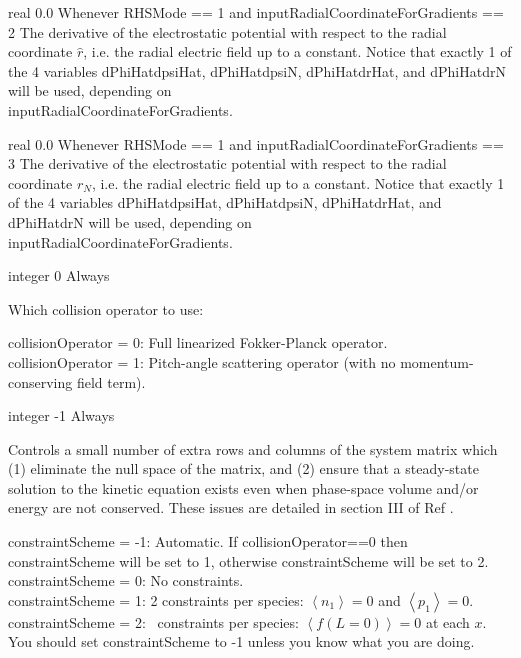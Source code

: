 \myhrule

{real}
{0.0}
{Whenever {\ttfamily RHSMode} == 1 and {\ttfamily inputRadialCoordinateForGradients} == 2}
{The derivative of the electrostatic potential with respect to the radial coordinate $\hat{r}$,
i.e. the radial electric field up to a constant.
Notice that exactly 1 of the 4 variables {\ttfamily dPhiHatdpsiHat}, {\ttfamily dPhiHatdpsiN}, {\ttfamily dPhiHatdrHat}, and {\ttfamily dPhiHatdrN}
will be used, depending on\\
{\ttfamily inputRadialCoordinateForGradients}.
}

\myhrule

{real}
{0.0}
{Whenever {\ttfamily RHSMode} == 1 and {\ttfamily inputRadialCoordinateForGradients} == 3}
{The derivative of the electrostatic potential with respect to the radial coordinate $r_N$,
i.e. the radial electric field up to a constant.
Notice that exactly 1 of the 4 variables {\ttfamily dPhiHatdpsiHat}, {\ttfamily dPhiHatdpsiN}, {\ttfamily dPhiHatdrHat}, and {\ttfamily dPhiHatdrN}
will be used, depending on\\
{\ttfamily inputRadialCoordinateForGradients}.
}


\myhrule

{integer}
{0}
{Always}
{Which collision operator to use:\\

{\setlength{\parindent}{0cm}

{\ttfamily collisionOperator} = 0: Full linearized Fokker-Planck operator.\\

{\ttfamily collisionOperator} = 1: Pitch-angle scattering operator (with no momentum-conserving field term).
}}

\myhrule

{integer}
{-1}
{Always}
{Controls a small number of extra rows and columns of the system matrix
which (1) eliminate the null space of the matrix, and (2) ensure that a steady-state solution
to the kinetic equation exists even when phase-space volume and/or energy are not conserved.
These issues are detailed in section III of Ref \cite{sfincsPaper}.
\\

{\setlength{\parindent}{0cm}

{\ttfamily constraintScheme} = -1: Automatic. If {\ttfamily collisionOperator}==0 then {\ttfamily constraintScheme} will be set to 1, 
otherwise {\ttfamily constraintScheme} will be set to 2.\\

{\ttfamily constraintScheme} = 0: No constraints.\\

{\ttfamily constraintScheme} = 1: 2 constraints per species: $\left<n_1\right>=0$ and $\left<p_1\right>=0$.\\

{\ttfamily constraintScheme} = 2: \Nx~constraints per species: $\left< f(L=0)\right>=0$ at each $x$.\\

You should set {\ttfamily constraintScheme} to -1 unless you know what you are doing.
}}

